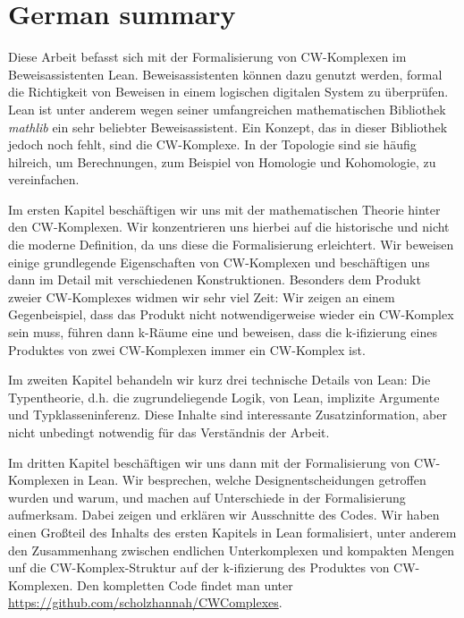 \chapter*{German summary}

Diese Arbeit befasst sich mit der Formalisierung von CW-Komplexen im Beweisassistenten Lean. 
Beweisassistenten können dazu genutzt werden, formal die Richtigkeit von Beweisen in einem logischen digitalen System zu überprüfen. 
Lean ist unter anderem wegen seiner umfangreichen mathematischen Bibliothek \emph{mathlib} ein sehr beliebter Beweisassistent. 
Ein Konzept, das in dieser Bibliothek jedoch noch fehlt, sind die CW-Komplexe. 
In der Topologie sind sie häufig hilreich, um Berechnungen, zum Beispiel von Homologie und Kohomologie, zu vereinfachen. 

Im ersten Kapitel beschäftigen wir uns mit der mathematischen Theorie hinter den CW-Komplexen. 
Wir konzentrieren uns hierbei auf die historische und nicht die moderne Definition, da uns diese die Formalisierung erleichtert. 
Wir beweisen einige grundlegende Eigenschaften von CW-Komplexen und beschäftigen uns dann im Detail mit verschiedenen Konstruktionen. 
Besonders dem Produkt zweier CW-Komplexes widmen wir sehr viel Zeit: Wir zeigen an einem Gegenbeispiel, dass das Produkt nicht notwendigerweise wieder ein CW-Komplex sein muss, führen dann k-Räume eine und beweisen, dass die k-ifizierung eines Produktes von zwei CW-Komplexen immer ein CW-Komplex ist.

Im zweiten Kapitel behandeln wir kurz drei technische Details von Lean: Die Typentheorie, d.h. die zugrundeliegende Logik, von Lean, implizite Argumente und Typklasseninferenz.
Diese Inhalte sind interessante Zusatzinformation, aber nicht unbedingt notwendig für das Verständnis der Arbeit. 

Im dritten Kapitel beschäftigen wir uns dann mit der Formalisierung von CW-Komplexen in Lean. 
Wir besprechen, welche Designentscheidungen getroffen wurden und warum, und machen auf Unterschiede in der Formalisierung aufmerksam. 
Dabei zeigen und erklären wir Ausschnitte des Codes. 
Wir haben einen Großteil des Inhalts des ersten Kapitels in Lean formalisiert, unter anderem den Zusammenhang zwischen endlichen Unterkomplexen und kompakten Mengen unf die CW-Komplex-Struktur auf der k-ifizierung des Produktes von CW-Komplexen.
Den kompletten Code findet man unter \url{https://github.com/scholzhannah/CWComplexes}.